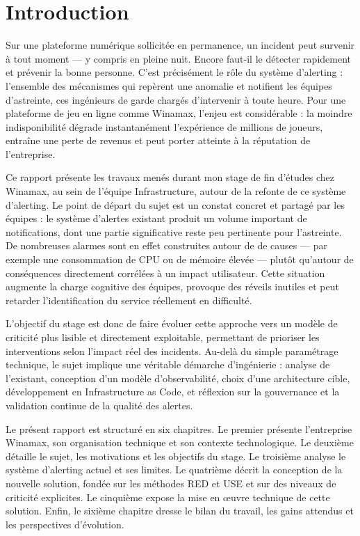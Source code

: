 \chapter*{Introduction}

Sur une plateforme numérique sollicitée en permanence, un incident peut survenir à tout moment — y
compris en pleine nuit. Encore faut-il le détecter rapidement et prévenir la bonne personne. C’est
précisément le rôle du système d’alerting : l’ensemble des mécanismes qui repèrent une anomalie et
notifient les équipes d’astreinte, ces ingénieurs de garde chargés d’intervenir à toute heure. Pour une
plateforme de jeu en ligne comme Winamax, l’enjeu est considérable : la moindre indisponibilité dégrade
instantanément l’expérience de millions de joueurs, entraîne une perte de revenus et peut porter atteinte
à la réputation de l’entreprise.

Ce rapport présente les travaux menés durant mon stage de fin d’études chez Winamax, au sein de
l’équipe Infrastructure, autour de la refonte de ce système d’alerting. Le point de départ du sujet est un
constat concret et partagé par les équipes : le système d’alertes existant produit un volume important de
notifications, dont une partie significative reste peu pertinente pour l’astreinte. De nombreuses alarmes
sont en effet construites autour de  de causes — par exemple une consommation de CPU
ou de mémoire élevée — plutôt qu’autour de conséquences directement corrélées à un impact utilisateur.
Cette situation augmente la charge cognitive des équipes, provoque des réveils inutiles et peut retarder
l’identification du service réellement en difficulté.

L’objectif du stage est donc de faire évoluer cette approche vers un modèle de criticité plus lisible et
directement exploitable, permettant de prioriser les interventions selon l’impact réel des incidents. Au-delà du
simple paramétrage technique, le sujet implique une véritable démarche d’ingénierie : analyse de l’existant,
conception d’un modèle d’observabilité, choix d’une architecture cible, développement en Infrastructure
as Code, et réflexion sur la gouvernance et la validation continue de la qualité des alertes.

Le présent rapport est structuré en six chapitres. Le premier présente l’entreprise Winamax, son
organisation technique et son contexte technologique. Le deuxième détaille le sujet, les motivations et les
objectifs du stage. Le troisième analyse le système d’alerting actuel et ses limites. Le quatrième décrit la
conception de la nouvelle solution, fondée sur les méthodes RED et USE et sur des niveaux de criticité
explicites. Le cinquième expose la mise en œuvre technique de cette solution. Enfin, le sixième chapitre dresse le bilan du travail, les gains attendus et les
perspectives d’évolution.
